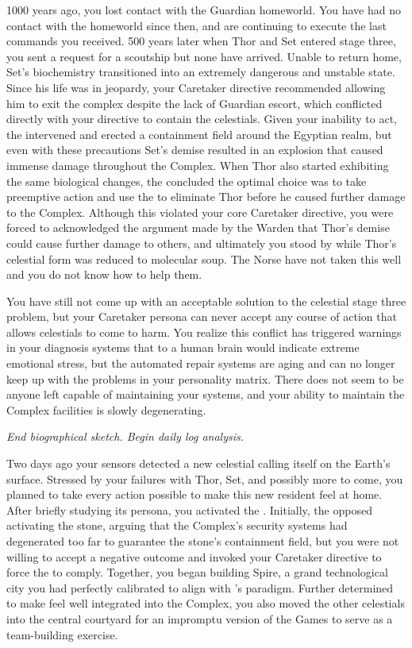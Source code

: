 \documentclass[char]{guardians}
\begin{document}
1000 years ago, you lost contact with the Guardian homeworld. You have had no contact with the homeworld since then, and are continuing to execute the last commands you received. 500 years later when Thor and Set entered stage three, you sent a request for a scoutship but none have arrived. Unable to return home, Set's biochemistry transitioned into an extremely dangerous and unstable state. Since his life was in jeopardy, your Caretaker directive recommended allowing him to exit the complex despite the lack of Guardian escort, which conflicted directly with your directive to contain the celestials. Given your inability to act, the \cWarden{} intervened and erected a containment field around the Egyptian realm, but even with these precautions Set's demise resulted in an explosion that caused immense damage throughout the Complex. When Thor also started exhibiting the same biological changes, the \cWarden{} concluded the optimal choice was to take preemptive action and use the \assembler{} to eliminate Thor before he caused further damage to the Complex. Although this violated your core Caretaker directive, you were forced to acknowledged the argument made by the Warden that Thor's demise could cause further damage to others, and ultimately you stood by while Thor's celestial form was reduced to molecular soup. The Norse have not taken this well and you do not know how to help them.

You have still not come up with an acceptable solution to the celestial stage three problem, but your Caretaker persona can never accept any course of action that allows celestials to come to harm. You realize this conflict has triggered warnings in your diagnosis systems that to a human brain would indicate extreme emotional stress, but the automated repair systems are aging and can no longer keep up with the problems in your personality matrix. There does not seem to be anyone left capable of maintaining your systems, and your ability to maintain the Complex facilities is slowly degenerating.

\emph{End biographical sketch. Begin daily log analysis.}

Two days ago your sensors detected a new celestial calling itself \cUnity{} on the Earth's surface. Stressed by your failures with Thor, Set, and possibly more to come, you planned to take every action possible to make this new resident feel at home. After briefly studying its persona, you activated the \stone{}. Initially, the \cWarden{} opposed activating the stone, arguing that the Complex's security systems had degenerated too far to guarantee the stone's containment field, but you were not willing to accept a negative outcome and invoked your Caretaker directive to force the \cWarden{} to comply. Together, you began building Spire, a grand technological city you had perfectly calibrated to align with \cUnity{}'s paradigm. Further determined to make \cUnity{} feel well integrated into the Complex, you also moved the other celestials into the central courtyard for an impromptu version of the Games to serve as a team-building exercise.
\end{document}
